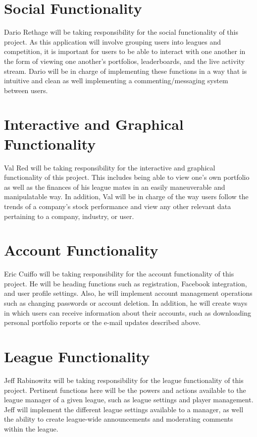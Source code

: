 \documentclass[11pt,letterpaper,oneside]{memoir}
\begin{document}
\section{Social Functionality}

Dario Rethage will be taking responsibility for the social functionality of this project. As this
application will involve grouping users into leagues and competition, it is important for users
to be able to interact with one another in the form of viewing one another's portfolios,
leaderboards, and the live activity stream. Dario will be in charge of implementing these functions
in a way that is intuitive and clean as well implementing a commenting/messaging system
between users.

\section{Interactive and Graphical Functionality}

Val Red will be taking responsibility for the interactive and graphical functionality of this project.
This includes being able to view one's own portfolio as well as the finances of his league mates in
an easily maneuverable and manipulatable way. In addition, Val will be in charge of the way
users follow the trends of a company's stock performance and view any other relevant data
pertaining to a company, industry, or user.

\section{Account Functionality}
Eric Cuiffo will be taking responsibility for the account functionality of this project. He will be
heading functions such as registration, Facebook integration, and user profile settings. Also,
he will implement account management operations such as changing passwords or account deletion.
In addition, he will create ways in which users can receive information about their accounts, such
as downloading personal portfolio reports or the e-mail updates described above.

\section{League Functionality}
Jeff Rabinowitz will be taking responsibility for the league functionality of this project. Pertinent
functions here will be the powers and actions available to the league manager of a given league,
such as league settings and player management. Jeff will implement the different league
settings available to a manager, as well the ability to create league-wide announcements and
moderating comments within the league.
\end{document}

